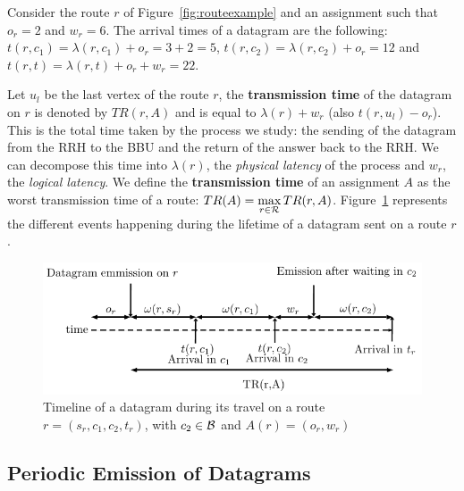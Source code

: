 \documentclass[a4paper,10pt]{journal}
\begin{document}
        \begin{examplee}
        Consider the route $r$ of Figure~\ref{fig:routeexample} and an assignment such that $o_r=2$ and $w_r = 6$. The arrival times of a datagram are the following: $t(r,c_1) =  \lambda(r,c_1) + o_r =  3 + 2 = 5$, $t(r,c_2) = \lambda(r,c_2) + o_r = 12$ and  $t(r,t) = \lambda(r,t) + o_r + w_r  = 22$.
        \end{examplee}

 		 Let $u_l$ be the last vertex of the route $r$, the \textbf{transmission time} of the datagram on 
  		$r$ is denoted by $TR(r,A)$ and is equal to $\lambda(r) + w_r$ (also $t(r,u_l) - o_r$). This is the total time taken by the process we study: the sending of the datagram from the RRH to the BBU and the return of the answer back to the RRH. We can decompose this time into $\lambda(r)$, the \emph{physical latency} of the process and $w_r$, the \emph{logical latency}. 
  		We define the \textbf{transmission time} of an assignment $A$ as the worst transmission time of a route: $TR(A) = \displaystyle \max\limits_{r \in {\cal R}} TR(r,A)$. 
        Figure~\ref{fig:datagramtimeline} represents the different events happening during the lifetime  of a datagram  sent on a route $r$.
  		\begin{figure}
  		 \begin{center}
      \includegraphics[width=\textwidth]{time.pdf}
      \end{center}
      \caption{Timeline of a datagram during its travel on a route $r = (s_r,c_1,c_2,t_r)$, with $c_2 \in \cal{B}$ and $A(r) = (o_r,w_r)$}
      \label{fig:datagramtimeline}
  		\end{figure}




 	\subsection{Periodic Emission of Datagrams}
\end{document}
